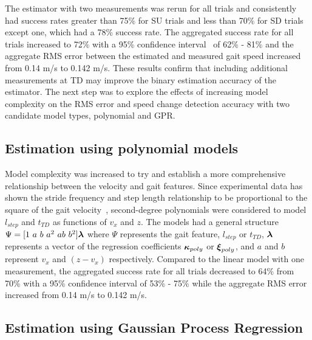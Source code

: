 The estimator with two measurements was rerun for all trials and consistently had success rates greater than 75\% for SU trials and less than 70\% for SD trials except one, which had a 78\% success rate. The aggregated success rate for all trials increased to  72\% with a 95\% confidence interval~\cite{brown2001interval} of 62\% - 81\% and the aggregate RMS error between the estimated and measured gait speed increased from 0.14 m/s to 0.142 m/s.  These results confirm that including additional measurements at TD may improve the binary estimation accuracy of the estimator. The next step was to explore the effects of increasing model complexity on the RMS error and speed change detection accuracy with two candidate model types, polynomial and GPR.

\subsection{Estimation using polynomial models}

Model complexity was increased to try and establish a more comprehensive relationship between the velocity and gait features. Since experimental data has shown the stride frequency and step length relationship to be proportional to the square of the gait velocity~\cite{bailey2017relationship}, second-degree polynomials were considered to model $ l_{step} $ and $ t_{TD} $ as functions of $ v_x $ and $ z $. The models had a general structure $ \Psi = [1\ a\ b\ a^2\ ab\ b^2 ] \greekvec{\lambda}$ where $ \Psi $ represents the gait feature, $ l_{step} $ or $ t_{TD} $, $ \boldsymbol{\lambda} $ represents a vector of the regression coefficients $ \boldsymbol{\kappa}_{poly} $ or $ \boldsymbol{\xi}_{poly} $, and $ a $ and $ b $ represent $v_x$ and $(z - v_x) $ respectively. Compared to the linear model with one measurement, the aggregated success rate for all trials decreased to  64\% from 70\% with a 95\% confidence interval of 53\% - 75\% while the aggregate RMS error increased from 0.14 m/s to 0.142 m/s.

\subsection{Estimation using Gaussian Process Regression}

